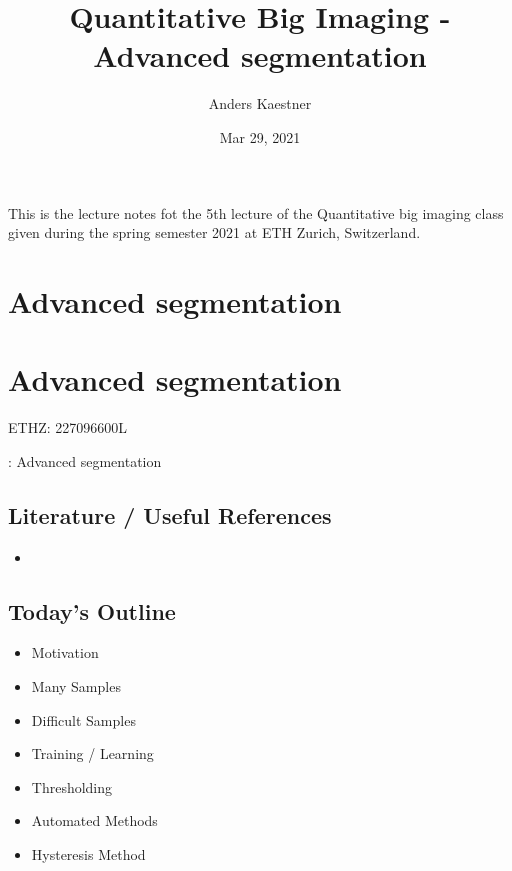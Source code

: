 \documentclass[letterpaper,10pt,english]{sphinxmanual}
\title{Quantitative Big Imaging - Advanced segmentation}
\date{Mar 29, 2021}
\author{Anders Kaestner}
\begin{document}
\pagestyle{empty}
\sphinxmaketitle
\pagestyle{plain}
\sphinxtableofcontents
\pagestyle{normal}
\label{\detokenize{preface::doc}}


\sphinxAtStartPar
This is the lecture notes fot the 5th lecture of the Quantitative big imaging class given during the spring semester 2021 at ETH Zurich, Switzerland.


\chapter{Advanced segmentation}
\label{\detokenize{05-AdvancedSegmentation:advanced-segmentation}}\label{\detokenize{05-AdvancedSegmentation::doc}}

\chapter{Advanced segmentation}
\label{\detokenize{05-AdvancedSegmentation:id1}}


\sphinxAtStartPar
{} ETHZ: 227\sphinxhyphen{}0966\sphinxhyphen{}00L

\sphinxAtStartPar
{}: Advanced segmentation






\section{Literature / Useful References}
\label{\detokenize{05-AdvancedSegmentation:literature-useful-references}}\begin{itemize}
\item {} 
\sphinxAtStartPar
{}

\end{itemize}


\section{Today’s Outline}
\label{\detokenize{05-AdvancedSegmentation:today-s-outline}}\begin{itemize}
\item {} 
\sphinxAtStartPar
Motivation

\item {} 
\sphinxAtStartPar
Many Samples

\item {} 
\sphinxAtStartPar
Difficult Samples

\item {} 
\sphinxAtStartPar
Training / Learning

\item {} 
\sphinxAtStartPar
Thresholding

\item {} 
\sphinxAtStartPar
Automated Methods

\item {} 
\sphinxAtStartPar
Hysteresis Method

\end{itemize}
\end{document}
